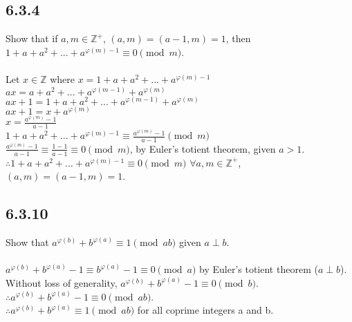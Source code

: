 \documentclass{article}
\begin{document}
\subsection{6.3.4}
Show that if $a, m \in \mathbb{Z}^+$, $(a,m)=(a-1,m)=1$,
then $1+a+a^2+...+a^{\varphi(m)-1}\equiv0\pmod{m}$.
\\
\\Let $x \in \mathbb{Z}$ where $x = 1+a+a^2+...+a^{\varphi(m)-1}$
\\$ax = a+a^2+...+a^{\varphi(m-1)}+a^{\varphi(m)}$
\\$ax+1 = 1+a+a^2+...+a^{\varphi(m-1)}+a^{\varphi(m)}$
\\$ax+1 = x+a^{\varphi(m)}$
\\$x = \frac{a^{\varphi(m)}-1}{a-1}$
\\$1+a+a^2+...+a^{\varphi(m)-1} \equiv \frac{a^{\varphi(m)}-1}{a-1} \pmod{m}$
\\$\frac{a^{\varphi(m)}-1}{a-1} \equiv \frac{1-1}{a-1} \equiv 0 \pmod{m}$,
by Euler's totient theorem, given $a > 1$.
\\$\therefore 1+a+a^2+...+a^{\varphi(m)-1}\equiv0\pmod{m}$
\;\;$\forall a, m \in \mathbb{Z}^+$, $(a,m)=(a-1,m)=1$.

\subsection{6.3.10}
Show that $a^{\varphi(b)}+b^{\varphi(a)}\equiv1\pmod{ab}$ given $a \perp b$.
\\
\\$a^{\varphi(b)}+b^{\varphi(a)}-1\equiv
b^{\varphi(a)}-1 \equiv
0 \pmod{a}$ by Euler's totient theorem ($a \perp b$).
\\Without loss of generality,
$a^{\varphi(b)}+b^{\varphi(a)}-1\equiv0\pmod{b}$.
\\$\therefore a^{\varphi(b)}+b^{\varphi(a)}-1\equiv0\pmod{ab}$.
\\$\therefore a^{\varphi(b)}+b^{\varphi(a)}\equiv1\pmod{ab}$
for all coprime integers a and b.
\end{document}
